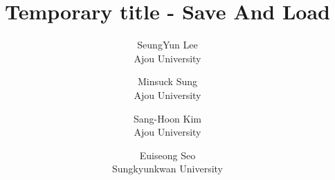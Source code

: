 \documentclass[letterpaper,twocolumn,10pt]{article}
\title{Temporary title - Save And Load}
\author{
{\rm SeungYun Lee}\\
Ajou University
\and
{\rm Minsuck Sung}\\
Ajou University
\and
{\rm Sang-Hoon Kim}\\
Ajou University
\and
{\rm Euiseong Seo}\\
Sungkyunkwan University
}
\date{}
\begin{document}
\maketitle

\begin{abstract}

\end{abstract}













\end{document}
